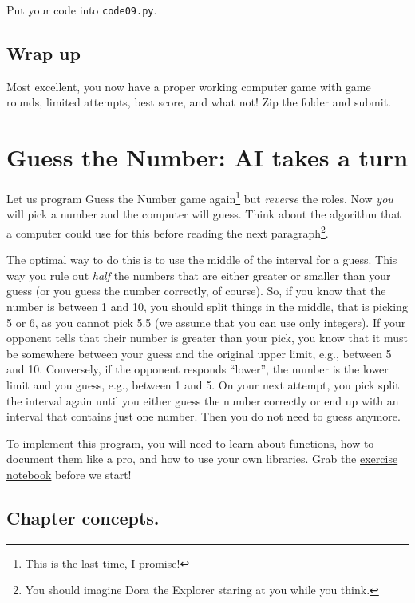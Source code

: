 \documentclass[
]{book}
\begin{document}
Put your code into \texttt{code09.py}.

\hypertarget{wrap-up}{%
\section{Wrap up}\label{wrap-up}}

Most excellent, you now have a proper working computer game with game rounds, limited attempts, best score, and what not! Zip the folder and submit.

\hypertarget{guess-the-number-ai}{%
\chapter{Guess the Number: AI takes a turn}\label{guess-the-number-ai}}

Let us program Guess the Number game again\footnote{This is the last time, I promise!} but \emph{reverse} the roles. Now \emph{you} will pick a number and the computer will guess. Think about the algorithm that a computer could use for this before reading the next paragraph\footnote{You should imagine Dora the Explorer staring at you while you think.}.

The optimal way to do this is to use the middle of the interval for a guess. This way you rule out \emph{half} the numbers that are either greater or smaller than your guess (or you guess the number correctly, of course). So, if you know that the number is between 1 and 10, you should split things in the middle, that is picking 5 or 6, as you cannot pick 5.5 (we assume that you can use only integers). If your opponent tells that their number is greater than your pick, you know that it must be somewhere between your guess and the original upper limit, e.g., between 5 and 10. Conversely, if the opponent responds ``lower'', the number is the lower limit and you guess, e.g., between 1 and 5. On your next attempt, you pick split the interval again until you either guess the number correctly or end up with an interval that contains just one number. Then you do not need to guess anymore.

To implement this program, you will need to learn about functions, how to document them like a pro, and how to use your own libraries. Grab the \href{notebooks/05.\%20Guess\%20the\%20number\%20-\%20AI.ipynb}{exercise notebook} before we start!

\hypertarget{chapter-concepts.}{%
\section{Chapter concepts.}\label{chapter-concepts.}}
\end{document}

